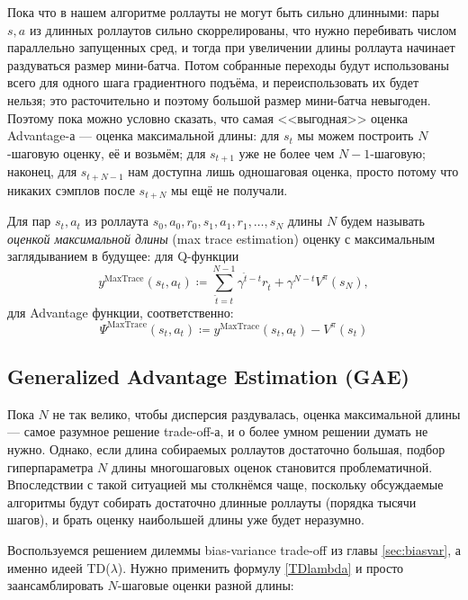 Пока что в нашем алгоритме роллауты не могут быть сильно длинными: пары $s, a$ из длинных роллаутов сильно скоррелированы, что нужно перебивать числом параллельно запущенных сред, и тогда при увеличении длины роллаута начинает раздуваться размер мини-батча. Потом собранные переходы будут использованы всего для одного шага градиентного подъёма, и переиспользовать их будет нельзя; это расточительно и поэтому большой размер мини-батча невыгоден. Поэтому пока можно условно сказать, что самая <<выгодная>> оценка Advantage-а --- оценка максимальной длины: для $s_t$ мы можем построить $N$-шаговую оценку, её и возьмём; для $s_{t+1}$ уже не более чем $N-1$-шаговую; наконец, для $s_{t+N-1}$ нам доступна лишь одношаговая оценка, просто потому что никаких сэмплов после $s_{t+N}$ мы ещё не получали. 

\begin{definition}
Для пар $s_t, a_t$ из роллаута $s_0, a_0, r_0, s_1, a_1, r_1, \dots, s_N$ длины $N$ будем называть \emph{оценкой максимальной длины} (max trace estimation) оценку с максимальным заглядыванием в будущее: для Q-функции
\begin{equation}\label{maxtrace}
y^{\mathrm{MaxTrace}} (s_t, a_t) \coloneqq \sum_{\hat{t}=t}^{N-1} \gamma^{\hat{t}-t} r_{\hat{t}} + \gamma^{N-t} V^\pi(s_N),
\end{equation}
для Advantage функции, соответственно:
\begin{equation*}\label{maxtraceadvantage}
\Psi^{\mathrm{MaxTrace}} (s_t, a_t) \coloneqq y^{\mathrm{MaxTrace}} (s_t, a_t) - V^\pi(s_t)
\end{equation*}
\end{definition}

\subsection{Generalized Advantage Estimation (GAE)}

Пока $N$ не так велико, чтобы дисперсия раздувалась, оценка максимальной длины --- самое разумное решение trade-off-а, и о более умном решении думать не нужно. Однако, если длина собираемых роллаутов достаточно большая, подбор гиперпараметра $N$ длины многошаговых оценок становится проблематичной. Впоследствии с такой ситуацией мы столкнёмся чаще, поскольку обсуждаемые алгоритмы будут собирать достаточно длинные роллауты (порядка тысячи шагов), и брать оценку наибольшей длины уже будет неразумно.

Воспользуемся решением дилеммы bias-variance trade-off из главы \ref{sec:biasvar}, а именно идеей TD($\lambda$). Нужно применить формулу \eqref{TDlambda} и просто заансамблировать $N$-шаговые оценки разной длины:

